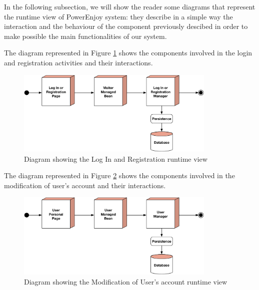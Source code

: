 In the following subsection, we will show the reader some diagrams that  represent the runtime view of PowerEnjoy system: they describe in a simple way the interaction and the behaviour of the component previously descibed in order to make possible the main functionalities of our system.

\newline
The diagram represented in Figure \ref{fig:login} shows the components involved in the login and registration activities and their interactions.

\begin{figure}[htbp]
\centering
\vspace{52pt}
\includegraphics[width=0.85\textwidth]{Images/LogInRun.pdf}
\vspace{10pt}
\caption{Diagram showing the Log In and Registration runtime view}
\label{fig:login}
\end{figure}
\clearpage

\newline
The diagram represented in Figure \ref{fig:modify} shows the components involved in the modification of user's account and their interactions.

\begin{figure}[htbp]
\centering
\vspace{104pt}
\includegraphics[width=0.85\textwidth]{Images/ModifyRun.pdf}
\vspace{10pt}
\caption{Diagram showing the Modification of User's account runtime view}
\label{fig:modify}
\end{figure}
\clearpage

